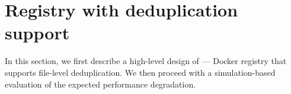 \section{Registry with deduplication support}
\label{sec:file_adressable}

%
In this section, we first describe a high-level design of \emph{\sysname}---
Docker registry that supports file-level deduplication.
We then proceed with a simulation-based evaluation of the expected performance
degradation.






